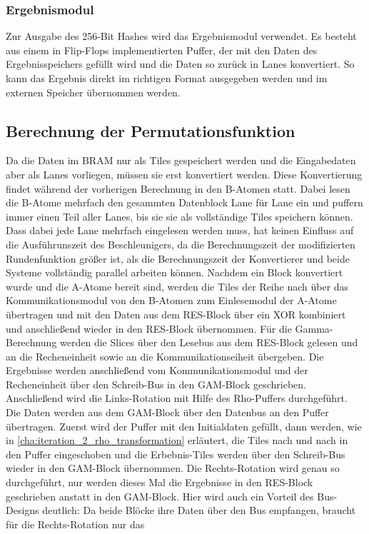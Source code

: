 \subsubsection{Ergebnismodul}
Zur Ausgabe des 256-Bit Hashes wird das Ergebnismodul verwendet. Es besteht aus einem in Flip-Flops implementierten Puffer,
der mit den Daten des Ergebnisspeichers gefüllt wird und die Daten so zurück in Lanes konvertiert.
So kann das Ergebnis direkt im richtigen Format ausgegeben werden und im externen Speicher übernommen werden.

\subsection{Berechnung der Permutationsfunktion}
Da die Daten im BRAM nur als Tiles gespeichert werden und die Eingabedaten aber als Lanes vorliegen, müssen sie erst konvertiert werden.
Diese Konvertierung findet während der vorherigen Berechnung in den B-Atomen statt.
Dabei lesen die B-Atome mehrfach den gesammten Datenblock Lane für Lane ein und puffern immer einen Teil aller Lanes, bis sie sie als vollständige Tiles speichern können.
Dass dabei jede Lane mehrfach eingelesen werden muss, hat keinen Einfluss auf die Ausführunszeit des Beschleunigers, da die Berechnungszeit der modifizierten Rundenfunktion größer ist,
als die Berechnungszeit der Konvertierer und beide Systeme vollständig parallel arbeiten können.
Nachdem ein Block konvertiert wurde und die A-Atome bereit sind, werden die Tiles der Reihe nach über das Kommunikationsmodul von den B-Atomen zum Einlesemodul der A-Atome übertragen
und mit den Daten aus dem RES-Block über ein XOR kombiniert und anschließend wieder in den RES-Block übernommen.
Für die Gamma-Berechnung werden die Slices über den Lesebus aus dem RES-Block gelesen und an die Recheneinheit sowie an die Kommunikationseiheit übergeben.
Die Ergebnisse werden anschließend vom Kommunikationsmodul und der Recheneinheit über den Schreib-Bus in den GAM-Block geschrieben.
Anschließend wird die Links-Rotation mit Hilfe des Rho-Puffers durchgeführt. Die Daten werden aus dem GAM-Block über den Datenbus an den Puffer übertragen.
Zuerst wird der Puffer mit den Initialdaten gefüllt, dann werden, wie in \ref{cha:iteration_2_rho_transformation} erläutert, die Tiles nach und nach in den Puffer eingeschoben
und die Erbebnis-Tiles werden über den Schreib-Bus wieder in den GAM-Block übernommen.
Die Rechts-Rotation wird genau so durchgeführt, nur werden dieses Mal die Ergebnisse in den RES-Block geschrieben anstatt in den GAM-Block.
Hier wird auch ein Vorteil des Bus-Designs deutlich: Da beide Blöcke ihre Daten über den Bus empfangen, braucht für die Rechts-Rotation nur das
